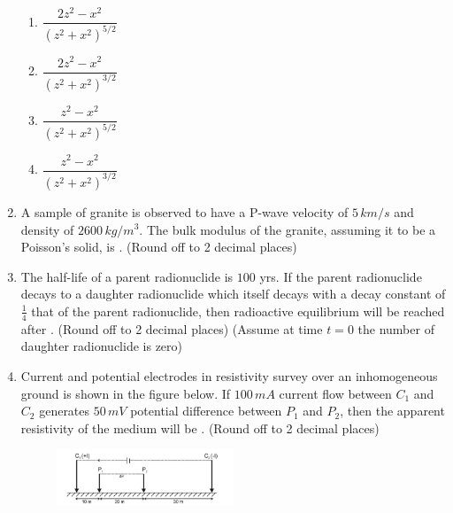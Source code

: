 \documentclass[journal,12pt,onecolumn]{IEEEtran}
\begin{document}
\begin{enumerate}
\hfill{}

\begin{multicols}{2}
\begin{enumerate}
\item $\dfrac{2z^2-x^2}{(z^2+x^2)^{5/2}}$
\item $\dfrac{2z^2-x^2}{(z^2+x^2)^{3/2}}$
\item $\dfrac{z^2-x^2}{(z^2+x^2)^{5/2}}$
\item $\dfrac{z^2-x^2}{(z^2+x^2)^{3/2}}$
\end{enumerate}
\end{multicols}


\item A sample of granite is observed to have a P-wave velocity of $5 \, km/s$ and density of $2600 \, kg/m^3$. The bulk modulus of the granite, assuming it to be a Poisson’s solid, is . (Round off to 2 decimal places)

\hfill{}


\item The half-life of a parent radionuclide is $100$ yrs. If the parent radionuclide decays to a daughter radionuclide which itself decays with a decay constant of $\tfrac{1}{4}$ that of the parent radionuclide, then radioactive equilibrium will be reached after . (Round off to 2 decimal places) (Assume at time $t=0$ the number of daughter radionuclide is zero)

\hfill{}


\item Current and potential electrodes in resistivity survey over an inhomogeneous ground is shown in the figure below. If $100 \, mA$ current flow between $C_1$ and $C_2$ generates $50 \, mV$ potential difference between $P_1$ and $P_2$, then the apparent resistivity of the medium will be . (Round off to 2 decimal places) \\
\begin{figure}[h]
\centering
\includegraphics[width=0.5\textwidth]{figs/fig13.png}
\caption{}
\label{fig:q21}
\end{figure}

\hfill{}



\end{enumerate}
\end{document}
